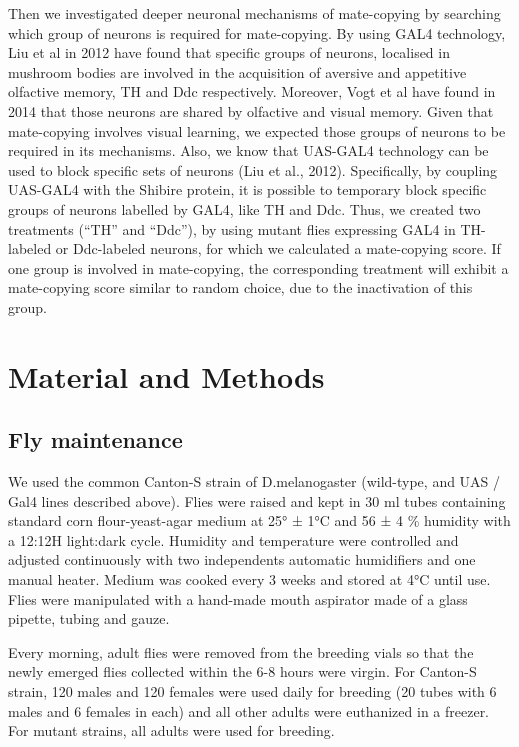 \documentclass[a4paper, 12pt]{article}
\begin{document}
	Then we investigated deeper neuronal mechanisms of mate-copying by searching which group of neurons is required for mate-copying. By using GAL4 technology, Liu et al in 2012 have found that specific groups of neurons, localised in mushroom bodies are involved in the acquisition of aversive and appetitive olfactive memory, TH and Ddc respectively. Moreover, Vogt et al have found in 2014 that those neurons are shared by olfactive and visual memory. Given that mate-copying involves visual learning, we expected those groups of neurons to be required in its mechanisms. Also, we know that UAS-GAL4 technology can be used to block specific sets of neurons (Liu et al., 2012). Specifically, by coupling UAS-GAL4 with the Shibire protein, it is possible to temporary block specific groups of neurons labelled by GAL4, like TH and Ddc. Thus, we created two treatments (“TH” and “Ddc”), by using mutant flies expressing GAL4 in TH-labeled or Ddc-labeled neurons, for which we calculated a mate-copying score. If one group is involved in mate-copying, the corresponding treatment will exhibit a mate-copying score similar to random choice, due to the inactivation of this group.
	
	\section{Material and Methods}

	\subsection{Fly maintenance}
	
	We used the common Canton-S strain of D.melanogaster (wild-type, and UAS / Gal4 lines described above). Flies were raised and kept in 30 ml tubes containing standard corn flour-yeast-agar medium at 25° ± 1°C and 56 ± 4 \% humidity with a 12:12H light:dark cycle. Humidity and temperature were controlled and adjusted continuously with two independents automatic humidifiers and one manual heater. Medium was cooked every 3 weeks and stored at 4°C until use. Flies were manipulated with a hand-made mouth aspirator made of a glass pipette, tubing and gauze.
	
	Every morning, adult flies were removed from the breeding vials so that the newly emerged flies collected within the 6-8 hours were virgin. For Canton-S strain, 120 males and 120 females were used daily for breeding (20 tubes with 6 males and 6 females in each) and all other adults were euthanized in a freezer. For mutant strains, all adults were used for breeding. 
	
\end{document}
